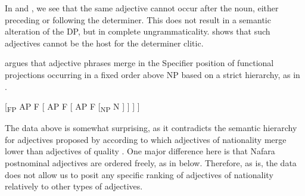 \documentclass[output=paper]{langscibook}
\begin{document}
\ea\label{ex:baron:10}

 
 
\z
\z


In  and , we see that the same adjective cannot occur after the noun, either preceding or following the determiner. This does not result in a semantic alteration of the DP, but in complete ungrammaticality.  shows that such adjectives cannot be the host for the determiner clitic. 

\citet{Cinque1994} argues that adjective phrases merge in the Specifier position of functional projections occurring in a fixed order above NP based on a strict hierarchy, as in .


\ea\label{ex:baron:11}
[\textsubscript{FP}  AP  F  [  AP  F  [  AP  F  [\textsubscript{NP}  N  ] ] ] ]
\z

The data above is somewhat surprising, as it contradicts the semantic hierarchy for adjectives proposed by \citet{Cinque1994} according to which adjectives of nationality merge lower than adjectives of quality \citep[96]{Cinque1994}. One major difference here is that Nafara postnominal adjectives are ordered freely, as in  below. Therefore, as is, the data does not allow us to posit any specific ranking of adjectives of nationality relatively to other types of adjectives.
\end{document}
